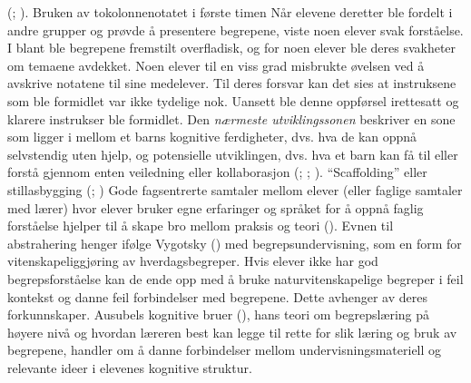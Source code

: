 \documentclass[main.tex]{subfiles}
\begin{document}
(; ). Bruken av tokolonnenotatet i første timen 
\newline
\newline
Når elevene deretter ble fordelt i andre grupper og prøvde å presentere begrepene, viste noen elever 
svak forståelse. I blant ble begrepene fremstilt overfladisk, og for noen elever ble deres svakheter 
om temaene avdekket. Noen elever til en viss grad misbrukte øvelsen ved å avskrive notatene til sine 
medelever. Til deres forsvar kan det sies at instruksene som ble formidlet var ikke tydelige nok. 
Uansett ble denne oppførsel irettesatt og klarere instrukser ble formidlet.
\newline
\newline
Den \emph{nærmeste utviklingssonen} beskriver en sone som ligger i mellom et barns kognitive 
ferdigheter, dvs. hva de kan oppnå selvstendig uten hjelp, og potensielle utviklingen, dvs. 
hva et barn kan få til eller forstå gjennom enten veiledning eller kollaborasjon 
(; ; ). ``Scaffolding'' 
eller stillasbygging (; )
\newline
\newline
Gode fagsentrerte samtaler mellom elever (eller faglige samtaler med lærer) hvor elever bruker egne 
erfaringer og språket for å oppnå faglig forståelse hjelper til å skape bro mellom praksis og teori 
().
\newline
\newline
Evnen til abstrahering henger ifølge Vygotsky () med begrepsundervisning, som en
form for vitenskapeliggjøring av hverdagsbegreper. Hvis elever ikke har god begrepsforståelse
kan de ende opp med å bruke naturvitenskapelige begreper i feil kontekst og danne feil 
forbindelser med begrepene. Dette avhenger av deres forkunnskaper. Ausubels kognitive bruer 
(), hans teori om begrepslæring på høyere nivå og hvordan læreren best kan 
legge til rette for slik læring og bruk av begrepene, handler om å danne forbindelser mellom 
undervisningsmateriell og relevante ideer i elevenes kognitive struktur.
\end{document}

